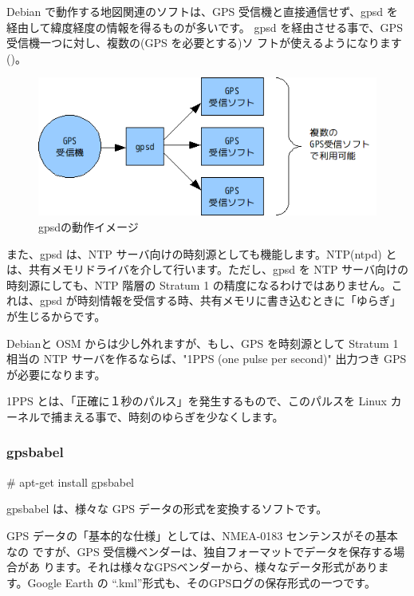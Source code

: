 \documentclass[mingoth,a4paper]{jsarticle}
\begin{document}
Debian で動作する地図関連のソフトは、GPS 受信機と直接通信せず、gpsd を経由して緯度経度の情報を得るものが多いです。
gpsd を経由させる事で、GPS 受信機一つに対し、複数の(GPS を必要とする)ソ
フトが使えるようになります()。

\begin{figure}[h]
 \centering
 \includegraphics[scale=0.9]{image200912/debianosm6.png}
 \caption{gpsdの動作イメージ}
 \label{fig:debianosm6}
\end{figure}

また、gpsd は、NTP サーバ向けの時刻源としても機能します。NTP(ntpd) とは、共有メモリドライバを介して行います。ただし、gpsd を NTP サーバ向けの時刻源にしても、NTP 階層の Stratum 1 の精度になるわけではありません。これは、gpsd が時刻情報を受信する時、共有メモリに書き込むときに「ゆらぎ」が生じるからです。

Debianと OSM からは少し外れますが、もし、GPS を時刻源として Stratum 1 相当の NTP サーバを作るならば、"1PPS (one pulse per second)" 出力つき GPS が必要になります。

1PPS とは、「正確に１秒のパルス」を発生するもので、このパルスを Linux カーネルで捕まえる事で、時刻のゆらぎを少なくします。

\subsubsection{gpsbabel}

\begin{commandline}
# apt-get install gpsbabel
\end{commandline}

gpsbabel は、様々な GPS データの形式を変換するソフトです。

GPS データの「基本的な仕様」としては、NMEA-0183 センテンスがその基本なの
ですが、GPS 受信機ベンダーは、独自フォーマットでデータを保存する場合があ
ります。それは様々なGPSベンダーから、様々なデータ形式があります。Google
Earth の “.kml”形式も、そのGPSログの保存形式の一つです。
\end{document}
